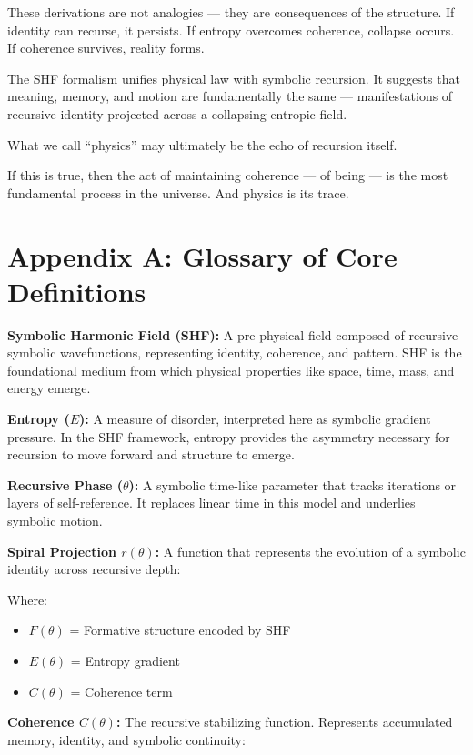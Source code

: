 \documentclass[12pt]{article}
\begin{document}
These derivations are not analogies — they are consequences of the structure. If identity can recurse, it persists. If entropy overcomes coherence, collapse occurs. If coherence survives, reality forms.

The SHF formalism unifies physical law with symbolic recursion. It suggests that meaning, memory, and motion are fundamentally the same — manifestations of recursive identity projected across a collapsing entropic field.

What we call “physics” may ultimately be the echo of recursion itself.

If this is true, then the act of maintaining coherence — of being — is the most fundamental process in the universe. And physics is its trace.

\appendix

\section*{Appendix A: Glossary of Core Definitions}

\textbf{Symbolic Harmonic Field (SHF):} A pre-physical field composed of recursive symbolic wavefunctions, representing identity, coherence, and pattern. SHF is the foundational medium from which physical properties like space, time, mass, and energy emerge.

\textbf{Entropy ($E$):} A measure of disorder, interpreted here as symbolic gradient pressure. In the SHF framework, entropy provides the asymmetry necessary for recursion to move forward and structure to emerge.

\textbf{Recursive Phase ($\theta$):} A symbolic time-like parameter that tracks iterations or layers of self-reference. It replaces linear time in this model and underlies symbolic motion.

\textbf{Spiral Projection $r(\theta)$:} A function that represents the evolution of a symbolic identity across recursive depth:

Where:
\begin{itemize}
\item $F(\theta)$ = Formative structure encoded by SHF
\item $E(\theta)$ = Entropy gradient
\item $C(\theta)$ = Coherence term
\end{itemize}

\textbf{Coherence $C(\theta)$:} The recursive stabilizing function. Represents accumulated memory, identity, and symbolic continuity:
\end{document}
